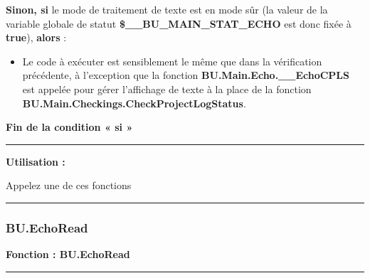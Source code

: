 \documentclass[a4paper,10pt]{article}
\begin{document}
\setlength{\parskip}{1em}

\begin{justify}
    \textbf{\color{cond}Sinon, si} le mode de traitement de texte est en mode sûr (la valeur de la variable globale de statut \textbf{\color{vars}\$\_\_BU\_MAIN\_STAT\_ECHO} est donc fixée à \textbf{true}), \textbf{\color{cond}alors} :

    \begin{itemize}
        \item
        {
            \begin{justify}
                Le code à exécuter est sensiblement le même que dans la vérification précédente, à l'exception que la fonction \textbf{\color{func}BU.Main.Echo.\_\_EchoCPLS} est appelée pour gérer l'affichage de texte à la place de la fonction \textbf{\color{func}BU.Main.Checkings.CheckProjectLogStatus}.
            \end{justify}
        }
    \end{itemize}
\end{justify}

\begin{justify}
    \textbf{\color{cond}Fin de la condition « si »}
\end{justify}


\par\noindent\rule{\textwidth}{0.4pt}

\begin{justify}
    \textbf{Utilisation :}

    Appelez une de ces fonctions
\end{justify}



\color{sec3}\par\noindent\rule{\textwidth}{0.4pt}\color{text}

\color{sec3}
\subsubsection{BU.EchoRead}\color{text}

\begin{justify}
    \textbf{Fonction : \color{func}BU.EchoRead}
\end{justify}


\par\noindent\rule{\textwidth}{0.4pt}
\end{document}
